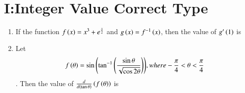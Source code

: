 \documentclass[journal,,12pt,onecolumn]{IEEEtran}
\theoremstyle{remark}
\begin{document}
\section*{I:Integer Value Correct Type}
\begin{enumerate}
    \item If the function $f\left(x\right)=x^3+e^{\frac{x}{2}}$ and $g\left(x\right)=f^{-1}\left(x\right)$, then the value of $g'\left(1\right)$ is 
    \hfill{}
    \item    Let \begin{align}f\left(\theta\right)=\sin{\ensuremath{\left(\tan^{-1}{\left(\frac{\sin{\theta}}{\sqrt{\cos{2\theta}}}\right)}\right)}} , where -\frac{\pi}{4}<\theta<\frac{\pi}{4}\end{align}. Then the value of $\frac{d}{d\left(\tan{\theta}\right)}\left(f\left(\theta\right)\right)$ is
\end{enumerate}  
\hfill{}
\end{document}
